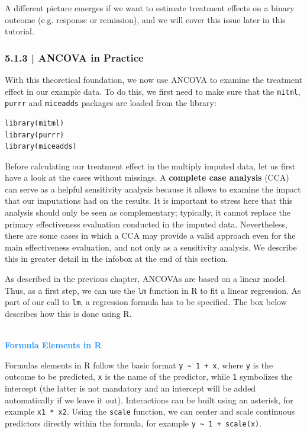 A different picture emerges if we want to estimate treatment effects on a binary outcome (e.g. response or remission), and we will cover this issue later in this tutorial.

\subsubsection{{\normalfont\textsf{\textcolor{sBlue}{\small 5.1.3 |}}} ANCOVA in Practice}

With this theoretical foundation, we now use ANCOVA to examine the treatment effect in our example data. To do this, we first need to make sure that the \texttt{mitml}, \texttt{purrr} and \texttt{miceadds} packages are loaded from the library:

\begin{lstlisting}
library(mitml)
library(purrr)
library(miceadds)
\end{lstlisting}


Before calculating our treatment effect in the multiply imputed data, let us first have a look at the cases without missings. A \textbf{complete case analysis} (CCA) can serve as a helpful sensitivity analysis because it allows to examine the impact that our imputations had on the results. It is important to stress here that this analysis should only be seen as complementary; typically, it cannot replace the primary effectiveness evaluation conducted in the imputed data. Nevertheless, there are some cases in which a CCA may provide a valid approach even for the main effectiveness evaluation, and not only as a sensitivity analysis. We describe this in greater detail in the infobox at the end of this section.

As described in the previous chapter, ANCOVAs are based on a linear model. Thus, as a first step, we can use the \texttt{lm} function in \textsf{R} to fit a linear regression. As part of our call to \texttt{lm}, a regression formula has to be specified. The box below describes how this is done using \textsf{R}.

\begin{box-info} \\
\textcolor{dodgerblue}{\textbf{Formula Elements in \textsf{R}}} 

\vspace{2mm}

Formulas elements in \textsf{R} follow the basic format \texttt{y~\textasciitilde~1 + x}, where \texttt{y} is the outcome to be predicted, \texttt{x} is the name of the predictor, while \texttt{1} symbolizes the intercept (the latter is not mandatory and an intercept will be added automatically if we leave it out). Interactions can be built using an asterisk, for example \texttt{x1 * x2}. Using the \texttt{scale} function, we can center and scale continuous predictors directly within the formula, for example \texttt{y~\textasciitilde~1 + scale(x)}.
\end{box-info}


